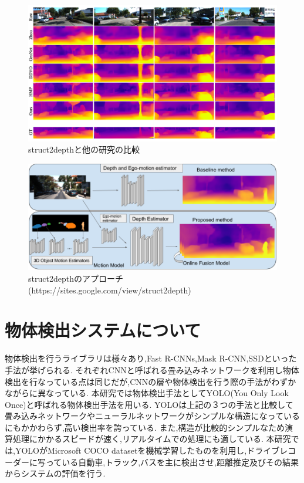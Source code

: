 \begin{figure}[hp]
  \begin{center}
   \includegraphics[width=\textwidth]{figs/struct2depth_related.png}
  \end{center}
  \caption{struct2depthと他の研究の比較\cite{casser2019struct2depth}}
  \label{fig:depth_related}
\end{figure}

\begin{figure}[hp]
  \begin{center}
   \includegraphics[width=\textwidth]{figs/aproach_depth.png}
  \end{center}
  \caption{struct2depthのアプローチ(https://sites.google.com/view/struct2depth)}
  \label{fig:approach_depth}
\end{figure}

\newpage
\section{物体検出システムについて}
物体検出を行うライブラリは様々あり,Fast R-CNNs\cite{ren2015faster},Mask R-CNN\cite{he2017mask},SSD\cite{liu2016ssd}といった手法が挙げられる.
それぞれCNNと呼ばれる畳み込みネットワークを利用し物体検出を行なっている点は同じだが,CNNの層や物体検出を行う際の手法がわずかながらに異なっている.
本研究では物体検出手法としてYOLO(You Only Look Once)\cite{yolov3}と呼ばれる物体検出手法を用いる.
YOLOは上記の３つの手法と比較して畳み込みネットワークやニューラルネットワークがシンプルな構造になっているにもかかわらず,高い検出率を誇っている.
また,構造が比較的シンプルなため演算処理にかかるスピードが速く,リアルタイムでの処理にも適している.
本研究では,YOLOがMicrosoft COCO datasetを機械学習したものを利用し,ドライブレコーダーに写っている自動車,トラック,バスを主に検出させ,距離推定及びその結果からシステムの評価を行う.


